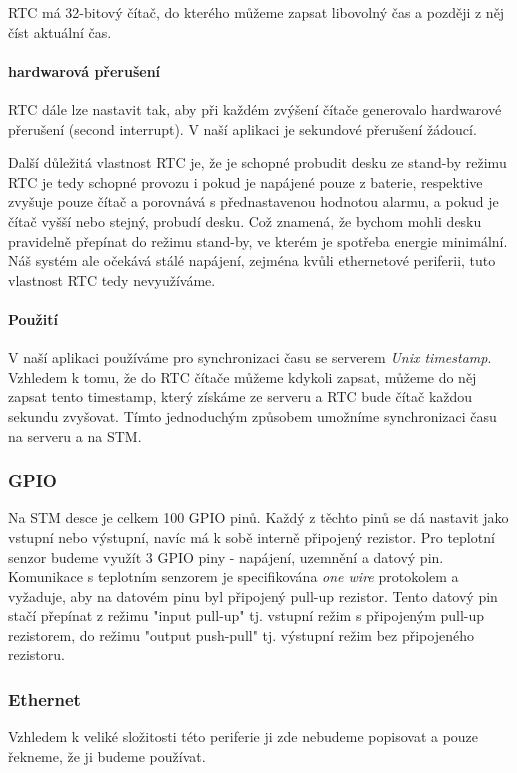 RTC má 32-bitový čítač, do kterého můžeme zapsat libovolný čas a později z
něj číst aktuální čas.

\paragraph{hardwarová přerušení}
RTC dále lze nastavit tak, aby při každém zvýšení čítače generovalo hardwarové
přerušení (second interrupt).
V naší aplikaci je sekundové přerušení žádoucí.

Další důležitá vlastnost RTC je, že je schopné probudit desku ze stand-by režimu
RTC je tedy schopné provozu i pokud je napájené pouze z baterie, respektive
zvyšuje pouze čítač a porovnává s přednastavenou hodnotou alarmu, a pokud je
čítač vyšší nebo stejný, probudí desku.
Což znamená, že bychom mohli desku pravidelně přepínat do režimu stand-by, ve
kterém je spotřeba energie minimální.
Náš systém ale očekává stálé napájení, zejména kvůli ethernetové periferii,
tuto vlastnost RTC tedy nevyužíváme.

\paragraph{Použití}
V naší aplikaci používáme pro synchronizaci času se serverem \emph{Unix timestamp}.
Vzhledem k tomu, že do RTC čítače můžeme kdykoli zapsat, můžeme do něj zapsat tento timestamp, který
získáme ze serveru a RTC bude čítač každou sekundu zvyšovat.
Tímto jednoduchým způsobem umožníme synchronizaci času na serveru a na STM.

\subsubsection{GPIO}
Na STM desce je celkem 100 GPIO pinů.
Každý z těchto pinů se dá nastavit jako vstupní nebo výstupní, navíc má k sobě interně připojený
rezistor.
Pro teplotní senzor budeme využít 3 GPIO piny - napájení, uzemnění a datový pin.
Komunikace s teplotním senzorem je specifikována \emph{one wire} protokolem a vyžaduje, aby na
datovém pinu byl připojený pull-up rezistor.
Tento datový pin stačí přepínat z režimu "input pull-up" tj. vstupní režim s připojeným pull-up
rezistorem, do režimu "output push-pull" tj. výstupní režim bez připojeného rezistoru.

\subsubsection{Ethernet}
Vzhledem k veliké složitosti této periferie ji zde nebudeme popisovat a pouze řekneme, že ji
budeme používat.
